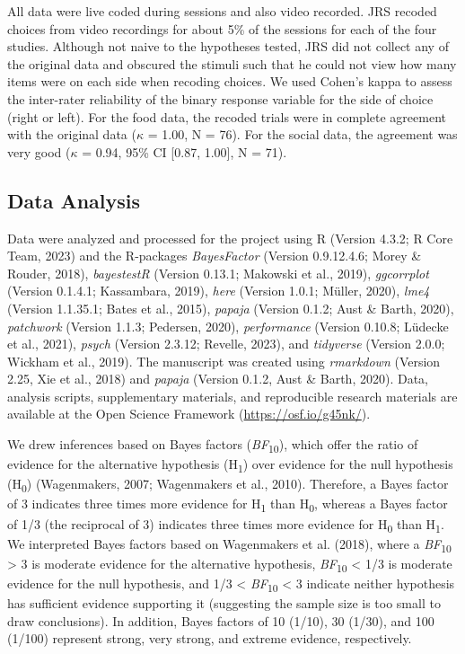 \documentclass[
  ,pub,floatsintext]{apa6}
\begin{document}
All data were live coded during sessions and also video recorded. JRS recoded choices from video recordings for about 5\% of the sessions for each of the four studies. Although not naive to the hypotheses tested, JRS did not collect any of the original data and obscured the stimuli such that he could not view how many items were on each side when recoding choices. We used Cohen's kappa to assess the inter-rater reliability of the binary response variable for the side of choice (right or left). For the food data, the recoded trials were in complete agreement with the original data (\(\kappa\) = 1.00, N = 76). For the social data, the agreement was very good (\(\kappa\) = 0.94, 95\% CI {[}0.87, 1.00{]}, N = 71).

\hypertarget{data-analysis}{%
\subsection{Data Analysis}\label{data-analysis}}

Data were analyzed and processed for the project using R (Version 4.3.2; R Core Team, 2023) and the R-packages \emph{BayesFactor} (Version 0.9.12.4.6; Morey \& Rouder, 2018), \emph{bayestestR} (Version 0.13.1; Makowski et al., 2019), \emph{ggcorrplot} (Version 0.1.4.1; Kassambara, 2019), \emph{here} (Version 1.0.1; Müller, 2020), \emph{lme4} (Version 1.1.35.1; Bates et al., 2015), \emph{papaja} (Version 0.1.2; Aust \& Barth, 2020), \emph{patchwork} (Version 1.1.3; Pedersen, 2020), \emph{performance} (Version 0.10.8; Lüdecke et al., 2021), \emph{psych} (Version 2.3.12; Revelle, 2023), and \emph{tidyverse} (Version 2.0.0; Wickham et al., 2019). The manuscript was created using \emph{rmarkdown} (Version 2.25, Xie et al., 2018) and \emph{papaja} (Version 0.1.2, Aust \& Barth, 2020). Data, analysis scripts, supplementary materials, and reproducible research materials are available at the Open Science Framework (\url{https://osf.io/g45nk/}).

We drew inferences based on Bayes factors (\emph{BF}\textsubscript{10}), which offer the ratio of evidence for the alternative hypothesis (H\textsubscript{1}) over evidence for the null hypothesis (H\textsubscript{0}) (Wagenmakers, 2007; Wagenmakers et al., 2010). Therefore, a Bayes factor of 3 indicates three times more evidence for H\textsubscript{1} than H\textsubscript{0}, whereas a Bayes factor of 1/3 (the reciprocal of 3) indicates three times more evidence for H\textsubscript{0} than H\textsubscript{1}. We interpreted Bayes factors based on Wagenmakers et al. (2018), where a \emph{BF}\textsubscript{10} \textgreater{} 3 is moderate evidence for the alternative hypothesis, \emph{BF}\textsubscript{10} \textless{} 1/3 is moderate evidence for the null hypothesis, and 1/3 \textless{} \emph{BF}\textsubscript{10} \textless{} 3 indicate neither hypothesis has sufficient evidence supporting it (suggesting the sample size is too small to draw conclusions). In addition, Bayes factors of 10 (1/10), 30 (1/30), and 100 (1/100) represent strong, very strong, and extreme evidence, respectively.
\end{document}
